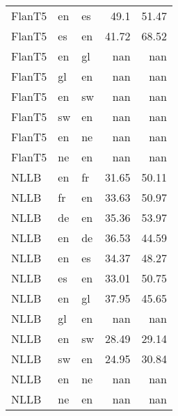 \begin{tabular}{lllrr}
 FlanT5   & en    & es    &  49.1  &  51.47 \\
 FlanT5   & es    & en    &  41.72 &  68.52 \\
 FlanT5   & en    & gl    & nan    & nan    \\
 FlanT5   & gl    & en    & nan    & nan    \\
 FlanT5   & en    & sw    & nan    & nan    \\
 FlanT5   & sw    & en    & nan    & nan    \\
 FlanT5   & en    & ne    & nan    & nan    \\
 FlanT5   & ne    & en    & nan    & nan    \\
 NLLB     & en    & fr    &  31.65 &  50.11 \\
 NLLB     & fr    & en    &  33.63 &  50.97 \\
 NLLB     & de    & en    &  35.36 &  53.97 \\
 NLLB     & en    & de    &  36.53 &  44.59 \\
 NLLB     & en    & es    &  34.37 &  48.27 \\
 NLLB     & es    & en    &  33.01 &  50.75 \\
 NLLB     & en    & gl    &  37.95 &  45.65 \\
 NLLB     & gl    & en    & nan    & nan    \\
 NLLB     & en    & sw    &  28.49 &  29.14 \\
 NLLB     & sw    & en    &  24.95 &  30.84 \\
 NLLB     & en    & ne    & nan    & nan    \\
 NLLB     & ne    & en    & nan    & nan    \\
\hline
\end{tabular}
